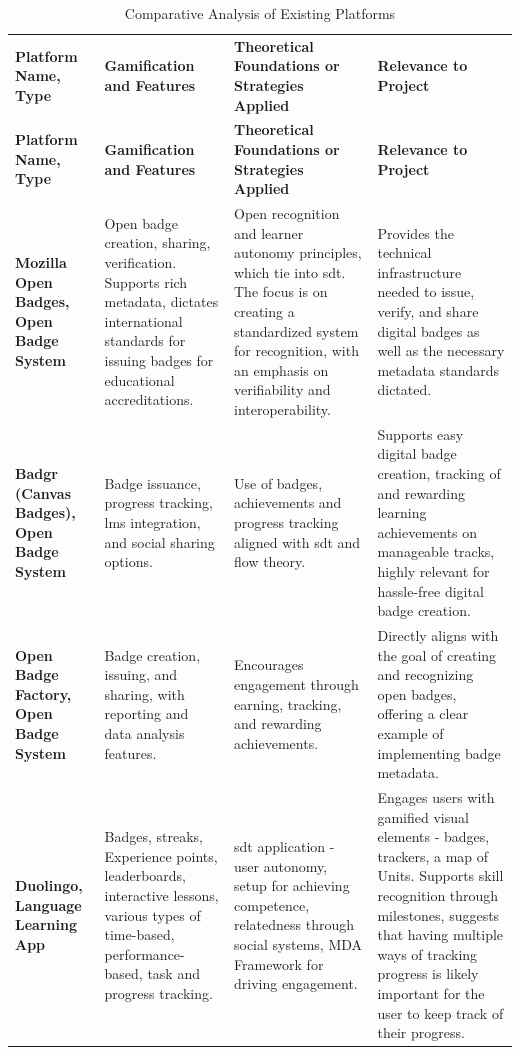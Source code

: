 \begin{longtable}[c]{|p{3cm}|p{4.2cm}|p{4.2cm}|p{4.2cm}|}
\captionsetup{justification=raggedright, singlelinecheck=false}
\caption{Comparative Analysis of Existing Platforms} \\
\hline
\textbf{Platform Name, Type} & \textbf{Gamification and Features} & \textbf{Theoretical Foundations or Strategies Applied} & \textbf{Relevance to Project} \\
\hline
\endfirsthead
\hline
\textbf{Platform Name, Type} & \textbf{Gamification and Features} & \textbf{Theoretical Foundations or Strategies Applied} & \textbf{Relevance to Project} \\
\hline
\endhead
\hline
\endfoot
\hline
\endlastfoot

\textbf{Mozilla Open Badges, Open Badge System} & Open badge creation, sharing, verification. Supports rich metadata, dictates international standards for issuing badges for educational accreditations. & Open recognition and learner autonomy principles, which tie into \acrshort{sdt}. The focus is on creating a standardized system for recognition, with an emphasis on verifiability and interoperability. & Provides the technical infrastructure needed to issue, verify, and share digital badges as well as the necessary metadata standards dictated. \\
\hline
\textbf{Badgr (Canvas Badges), Open Badge System} & Badge issuance, progress tracking, \acrshort{lms} integration, and social sharing options. & Use of badges, achievements and progress tracking aligned with \acrshort{sdt} and flow theory. & Supports easy digital badge creation, tracking of and rewarding learning achievements on manageable tracks, highly relevant for hassle-free digital badge creation. \\
\hline
\textbf{Open Badge Factory, Open Badge System} & Badge creation, issuing, and sharing, with reporting and data analysis features. & Encourages engagement through earning, tracking, and rewarding achievements. & Directly aligns with the goal of creating and recognizing open badges, offering a clear example of implementing badge metadata. \\
\hline
\textbf{Duolingo, Language Learning App} & Badges, streaks, Experience points, leaderboards, interactive lessons, various types of time-based, performance-based, task and progress tracking. & \acrshort{sdt} application - user autonomy, setup for achieving competence, relatedness through social systems, MDA Framework for driving engagement. & Engages users with gamified visual elements - badges, trackers, a map of Units. Supports skill recognition through milestones, suggests that having multiple ways of tracking progress is likely important for the user to keep track of their progress. \\

\end{longtable}

